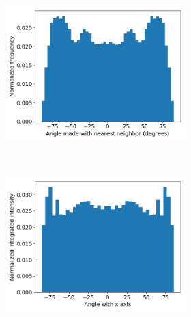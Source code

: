 \documentclass{article}
\begin{document}
  \begin{figure}
  \centering
  	\begin{subfigure}{\linewidth}
	\centering
		\begin{subfigure}{0.45\textwidth}
        		\centering
        		\includegraphics[width=\linewidth]{offset_tail_packing.png}
        		\caption{}~\label{fig:offset_tails}
		\end{subfigure}
		\begin{subfigure}{0.45\textwidth}
		\centering
	        	\includegraphics[width=\linewidth]{offset_angle_v_I.png}
		        \caption{}~\label{fig:offset_integration}
		\end{subfigure}
	\end{subfigure}

\end{figure}
\end{document}
